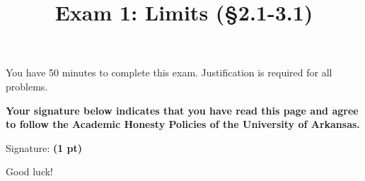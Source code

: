 \documentclass[12pt]{article}
\title{\vspace{-8pc}
\vfill{\Huge
	\bf Exam 1: Limits (\S 2.1-3.1)} 
	}
\author{}
\date{}
\begin{document}
\maketitle
\vspace{-3pc}
 You have 50 minutes to complete this exam.  Justification is required for all problems. 

\vspace{2pc}
\noindent\textbf{Your signature below indicates that you have read this page and agree to follow the Academic Honesty Policies of the University of Arkansas.}  

\vfill
\noindent Signature: {\bf (1 pt)} \underline{\hspace{73ex}}
\begin{flushright}\Large Good luck!\end{flushright}
\end{document}
